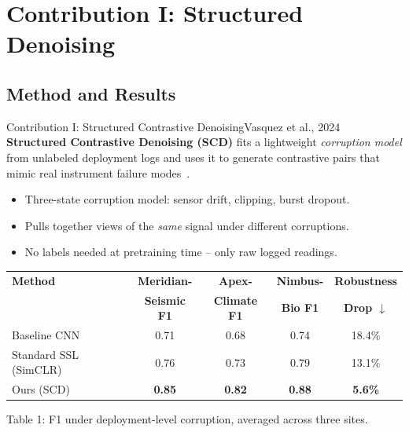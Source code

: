 \section{Contribution I: Structured Denoising}
\subsection{Method and Results}

\begin{frame}{Contribution I: Structured Contrastive Denoising}{Vasquez et al., 2024}
  \small
  \textbf{Structured Contrastive Denoising (SCD)} fits a lightweight
  \emph{corruption model} from unlabeled deployment logs and uses it to
  generate contrastive pairs that mimic real instrument failure
  modes~\cite{vasquez2024contrastive}.

  \begin{itemize}
    \item Three-state corruption model: sensor drift, clipping, burst dropout.
    \item Pulls together views of the \emph{same} signal under different corruptions.
    \item No labels needed at pretraining time -- only raw logged readings.
  \end{itemize}

  \vspace{0.1cm}
  \begin{center}
  {\scriptsize
  \begin{tabular}{lccc c}
    \toprule
    \textbf{Method} & \textbf{Meridian-} & \textbf{Apex-} & \textbf{Nimbus-} & \textbf{Robustness} \\
     & \textbf{Seismic F1} & \textbf{Climate F1} & \textbf{Bio F1} & \textbf{Drop $\downarrow$} \\
    \midrule
    Baseline CNN & 0.71 & 0.68 & 0.74 & 18.4\% \\
    Standard SSL (SimCLR) & 0.76 & 0.73 & 0.79 & 13.1\% \\
    \rowcolor{accentTeal!12}
    Ours (SCD) & \textbf{0.85} & \textbf{0.82} & \textbf{0.88} & \textbf{5.6\%} \\
    \bottomrule
  \end{tabular}
  }
  \par\vspace{0.08cm}
  {\scriptsize\textcolor{colorMuted}{Table 1: F1 under deployment-level corruption, averaged across three sites.}}
  \end{center}
\end{frame}
